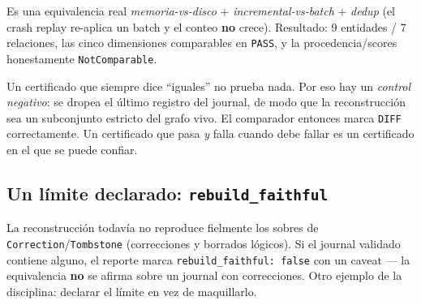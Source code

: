 \documentclass[11pt,a4paper]{article}
\newcommand{\code}[1]{\texttt{\small #1}}
\begin{document}
\begin{center}
\end{center}

Es una equivalencia real \emph{memoria-vs-disco} $+$ \emph{incremental-vs-batch}
$+$ \emph{dedup} (el crash replay re-aplica un batch y el conteo \textbf{no}
crece). Resultado: 9 entidades / 7 relaciones, las cinco dimensiones
comparables en \code{PASS}, y la procedencia/scores honestamente
\code{NotComparable}.

\begin{warnbox}
Un certificado que siempre dice ``iguales'' no prueba nada. Por eso hay un
\emph{control negativo}: se dropea el último registro del journal, de modo que
la reconstrucción sea un subconjunto estricto del grafo vivo. El comparador
entonces marca \code{DIFF} correctamente. Un certificado que pasa
\emph{y} falla cuando debe fallar es un certificado en el que se puede confiar.
\end{warnbox}

\subsection{Un límite declarado: \texttt{rebuild\_faithful}}

La reconstrucción todavía no reproduce fielmente los sobres de
\code{Correction}/\code{Tombstone} (correcciones y borrados lógicos). Si el
journal validado contiene alguno, el reporte marca
\code{rebuild\_faithful: false} con un caveat --- la equivalencia \textbf{no}
se afirma sobre un journal con correcciones. Otro ejemplo de la disciplina:
declarar el límite en vez de maquillarlo.
\end{document}
